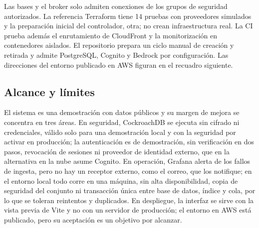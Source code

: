 Las bases y el broker solo admiten conexiones de los grupos de seguridad autorizados. La referencia Terraform tiene 14 pruebas con proveedores simulados y la preparación inicial del controlador, otra; no crean infraestructura real. La CI prueba además el enrutamiento de CloudFront y la monitorización en contenedores aislados. El repositorio prepara un ciclo manual de creación y retirada y admite PostgreSQL, Cognito y Bedrock por configuración. Las direcciones del entorno publicado en AWS figuran en el recuadro siguiente. \cite{aws,ci-integracion}


\subsection{Alcance y límites}\label{d-4}

El sistema es una demostración con datos públicos y su margen de mejora se concentra en tres áreas. En seguridad, CockroachDB se ejecuta sin cifrado ni credenciales, válido solo para una demostración local y con la seguridad por activar en producción; la autenticación es de demostración, sin verificación en dos pasos, revocación de sesiones ni proveedor de identidad externo, que en la alternativa en la nube asume Cognito. En operación, Grafana alerta de los fallos de ingesta, pero no hay un receptor externo, como el correo, que los notifique; en el entorno local todo corre en una máquina, sin alta disponibilidad, copia de seguridad del conjunto ni transacción única entre base de datos, índice y cola, por lo que se toleran reintentos y duplicados. En despliegue, la interfaz se sirve con la vista previa de Vite y no con un servidor de producción; el entorno en AWS está publicado, pero su aceptación es un objetivo por alcanzar.
